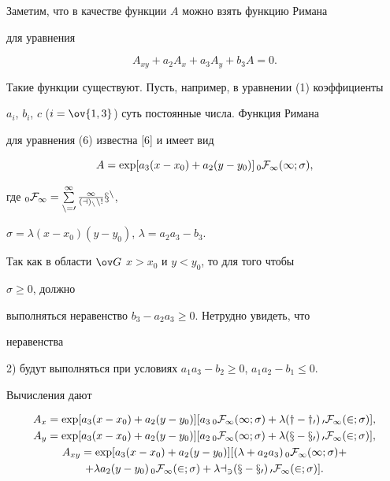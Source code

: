  


Заметим, что в качестве функции $A$ можно взять функцию Римана 


для уравнения 


\begin{equation} 


A_{xy}+a_2A_x+a_3A_y+b_3A=0. 


\end{equation} 


Такие функции существуют. Пусть, например, в уравнении (1) коэффициенты 


$a_i$, $b_i$, $c$ ($i=\ov{1,3}$) суть постоянные числа. Функция Римана 


для уравнения (6) известна [6] и имеет вид 


$$ 


A=\exp[a_3(x-x_0)+a_2(y-y_0)]\,_0\cal F_1(1;\sigma), 


$$ 


где $_0\cal F_1=\sum\limits^\infty_{n=0}\frac{1}{(a)_n n!}x^n$, 


$\sigma=\lambda(x-x_0)(y-y_0)$, $\lambda=a_2a_3-b_3$. 


Так как в области $\ov G$\; $x>x_0$ и $y<y_0$, то для того чтобы 


$\sigma\ge0$, должно 


выполняться неравенство $b_3-a_2a_3\ge0$. Нетрудно увидеть, что 


неравенства 


2) будут выполняться при условиях $a_1a_3-b_2\ge0$, $a_1a_2-b_1\le0$. 


Вычисления дают 


\begin{gather*} 


A_x=\exp[a_3(x-x_0)+a_2(y-y_0)][a_3\,_0\cal F_1(1;\sigma)+ 


\lambda(y-y_0)\,_0\cal F_1(2;\sigma)],\\ 


% 


A_y=\exp[a_3(x-x_0)+a_2(y-y_0)][a_2\,_0\cal F_1(1;\sigma)+ 


\lambda(x-x_0)\,_0\cal F_1(2;\sigma)],\\ 


% 


A_{xy}=\exp[a_3(x-x_0)+a_2(y-y_0)] 


[(\lambda+a_2a_3)\,_0\cal F_1(1;\sigma)+ \\ 


% 


+\lambda a_2(y-y_0)\,_0\cal F_1(2;\sigma)+ 


\lambda a_3(x-x_0)\,_0\cal F_1(2;\sigma)]. 


\end{gather*} 



